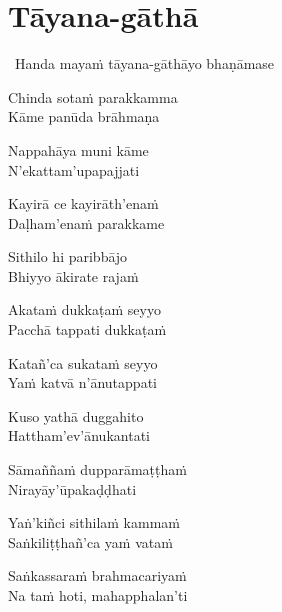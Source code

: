 \section{Tāyana-gāthā}
\label{tayana-gatha}

\begin{intro}
  \anglebracketleft\ \hspace{-0.5mm}Handa mayaṁ tāyana-gāthāyo bhaṇāmase \hspace{-0.5mm}\anglebracketright\
\end{intro}

\medskip

\begin{pali-hang}
Chinda sotaṁ parakkamma\\
Kāme panūda brāhmaṇa
\end{pali-hang}
\begin{pali-hang}
Nappahāya muni kāme\\
N'ekattam'upapajjati
\end{pali-hang}
\begin{pali-hang}
Kayirā ce kayirāth'enaṁ\\
Daḷham'enaṁ parakkame
\end{pali-hang}
\begin{pali-hang}
Sithilo hi paribbājo\\
Bhiyyo ākirate rajaṁ
\end{pali-hang}
\begin{pali-hang}
Akataṁ dukkaṭaṁ seyyo\\
Pacchā tappati dukkaṭaṁ
\end{pali-hang}
\begin{pali-hang}
Katañ'ca sukataṁ seyyo\\
Yaṁ katvā n'ānutappati
\end{pali-hang}
\begin{pali-hang}
Kuso yathā duggahito\\
Hattham'ev'ānukantati
\end{pali-hang}
\begin{pali-hang}
Sāmaññaṁ dupparāmaṭṭhaṁ\\
Nirayāy'ūpakaḍḍhati
\end{pali-hang}
\begin{pali-hang}
Yaṅ'kiñci sithilaṁ kammaṁ\\
Saṅkiliṭṭhañ'ca yaṁ vataṁ
\end{pali-hang}
\begin{pali-hang}
Saṅkassaraṁ brahmacariyaṁ\\
Na taṁ hoti, mahapphalan'ti
\end{pali-hang}

\clearpage
